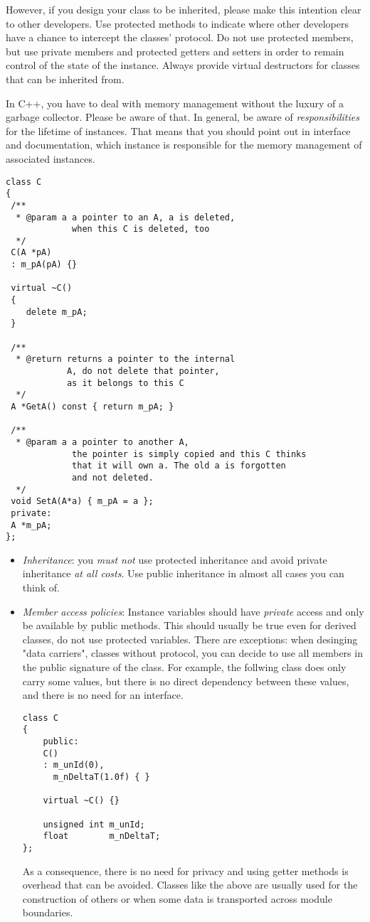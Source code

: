 However, if you design your class to be inherited, please make this intention clear to other developers.
Use protected methods to indicate where other developers have a chance to intercept the classes' protocol.
Do not use protected members, but use private members and protected getters and setters in order to remain control of the state of the instance.
Always provide virtual destructors for classes that can be inherited from.

In C++, you have to deal with memory management without the luxury of a garbage collector.
Please be aware of that.
In general, be aware of \emph{responsibilities} for the lifetime of instances.
That means that you should point out in interface and documentation, which instance is responsible for the memory management of associated instances.
\begin{verbatim}
class C
{
 /**
  * @param a a pointer to an A, a is deleted, 
             when this C is deleted, too
  */
 C(A *pA)
 : m_pA(pA) {}
 
 virtual ~C()
 {
 	delete m_pA;
 }
 
 /**
  * @return returns a pointer to the internal
            A, do not delete that pointer,
            as it belongs to this C
  */
 A *GetA() const { return m_pA; }
 
 /**
  * @param a a pointer to another A,
             the pointer is simply copied and this C thinks
             that it will own a. The old a is forgotten
             and not deleted.
  */
 void SetA(A*a) { m_pA = a };
 private:
 A *m_pA;
};
\end{verbatim}

\begin{itemize}
\item \emph{Inheritance}: you \emph{must not} use protected inheritance and avoid private inheritance \emph{at all costs}.
Use public inheritance in almost all cases you can think of.
\item \emph{Member access policies}: Instance variables should have \emph{private} access and only be available by public methods.
This should usually be true even for derived classes, do not use protected variables.
There are exceptions: when desinging "data carriers", classes without protocol, you can decide to use all members in the public signature of the class.
For example, the follwing class does only carry some values, but there is no direct dependency between these values, and there is no need for an interface.
\begin{verbatim}
class C
{
	public:
	C()
	: m_unId(0),
	  m_nDeltaT(1.0f) { }
	  
	virtual ~C() {}
	
	unsigned int m_unId;
	float        m_nDeltaT;
};
\end{verbatim}
As a consequence, there is no need for privacy and using getter methods is overhead that can be avoided.
Classes like the above are usually used for the construction of others or when some data is transported across module boundaries.
\end{itemize}

